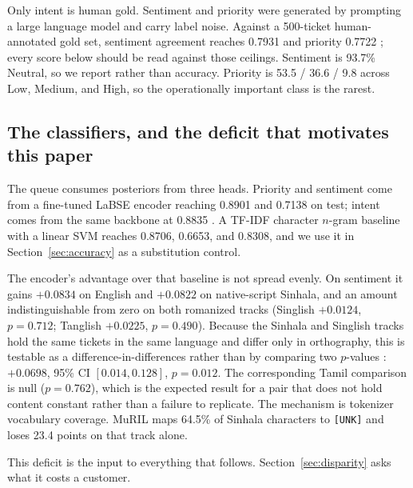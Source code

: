 Only intent is human gold. Sentiment and priority were generated by prompting a
large language model and carry label noise. Against a 500-ticket human-annotated
gold set, sentiment agreement reaches 0.7931 \negf{} and priority 0.7722
\macrof{}; every score below should be read against those ceilings. Sentiment is
93.7\% Neutral, so we report \negf{} rather than accuracy. Priority is
53.5 / 36.6 / 9.8 across Low, Medium, and High, so the operationally important
class is the rarest.

\subsection{The classifiers, and the deficit that motivates this paper}

The queue consumes posteriors from three heads. Priority and sentiment come from
a fine-tuned LaBSE encoder \cite{feng2022labse} reaching 0.8901 \macrof{} and
0.7138 \negf{} on test; intent comes from the same backbone at 0.8835 \macrof{}.
A TF-IDF character $n$-gram baseline with a linear SVM reaches 0.8706, 0.6653,
and 0.8308, and we use it in Section~\ref{sec:accuracy} as a substitution
control.

The encoder's advantage over that baseline is not spread evenly. On sentiment it
gains $+0.0834$ \negf{} on English and $+0.0822$ on native-script Sinhala, and an
amount indistinguishable from zero on both romanized tracks (Singlish $+0.0124$,
$p=0.712$; Tanglish $+0.0225$, $p=0.490$). Because the Sinhala and Singlish
tracks hold the same tickets in the same language and differ only in
orthography, this is testable as a difference-in-differences rather than by
comparing two $p$-values \cite{gelman2006significant}: $+0.0698$, 95\% CI
$[0.014, 0.128]$, $p=0.012$. The corresponding Tamil comparison is null
($p=0.762$), which is the expected result for a pair that does not hold content
constant rather than a failure to replicate. The mechanism is tokenizer vocabulary coverage.
MuRIL \cite{khanuja2021muril} maps 64.5\% of Sinhala characters to
\texttt{[UNK]} and loses 23.4 points on that track alone.

This deficit is the input to everything that follows. Section~\ref{sec:disparity}
asks what it costs a customer.
